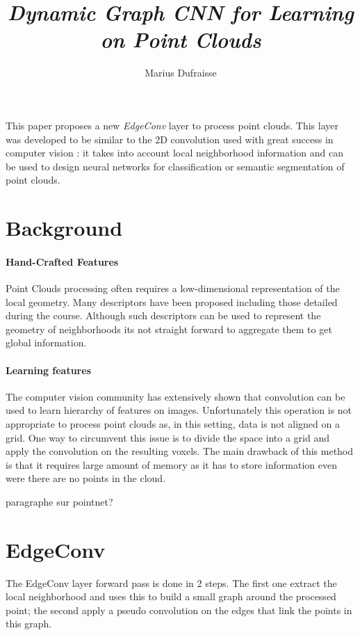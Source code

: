 \documentclass[french]{article}
\begin{document}
	\title{\textit{Dynamic Graph CNN for Learning on Point Clouds}
	}
	\author{Marius Dufraisse}
	\date{}
	
	\maketitle
	
	This paper proposes a new \emph{EdgeConv} layer to process point clouds. This layer was developed to be similar to the 2D convolution used with great success in computer vision : it takes into account local neighborhood information and can be used to design neural networks for classification or semantic segmentation of point clouds.
	
	
	\section{Background}
	\paragraph{Hand-Crafted Features} Point Clouds processing often requires a low-dimensional representation of the local geometry. Many descriptors have been proposed including those detailed during the course. Although such descriptors can be used to represent the geometry of neighborhoods its not straight forward to aggregate them to get global information.
	
	\paragraph{Learning features} The computer vision community has extensively shown that convolution can be used to learn hierarchy of features on images. Unfortunately this operation is not appropriate to process point clouds as, in this setting, data is not aligned on a grid. One way to circumvent this issue is to divide the space into a grid and apply the convolution on the resulting voxels. The main drawback of this method is that it requires large amount of memory as it has to store information even were there are no points in the cloud.
	
	paragraphe sur pointnet?
	
	
	\section{EdgeConv}
	The EdgeConv layer forward pass is done in 2 steps. The first one extract the local neighborhood and uses this to build a small graph around the processed point; the second apply a pseudo convolution on the edges that link the points in this graph.
	
\end{document}

